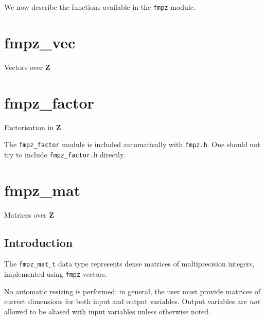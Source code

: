 \documentclass[a4paper,10pt]{book}
\newcommand{\Z}{\mathbf{Z}}%
\newcommand{\code}{\lstinline}
\begin{document}
{{We now describe the functions available in the \code{fmpz} module.




\chapter{fmpz\_vec}
\epigraph{Vectors over $\Z$}{}




\chapter{fmpz\_factor}
\epigraph{Factorisation in $\Z$}{}

The \code{fmpz_factor} module is included automatically with
\code{fmpz.h}. One should not try to include \code{fmpz_factor.h}
directly.




\chapter{fmpz\_mat}
\epigraph{Matrices over $\Z$}{}

\section{Introduction}

The \code{fmpz_mat_t} data type represents dense matrices of multiprecision
integers, implemented using \code{fmpz} vectors.

No automatic resizing is performed: in general, the user must provide
matrices of correct dimensions for both input and output variables. Output
variables are \emph{not} allowed to be aliased with input variables unless
otherwise noted.

}}
\end{document}
